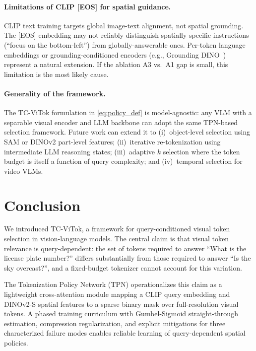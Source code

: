 \documentclass[11pt,a4paper]{article}
\begin{document}
\paragraph{Limitations of CLIP [EOS] for spatial guidance.}
CLIP text training targets global image-text alignment, not spatial grounding.
The [EOS] embedding may not reliably distinguish spatially-specific instructions
(``focus on the bottom-left'') from globally-answerable ones. Per-token
language embeddings or grounding-conditioned encoders (e.g., Grounding
DINO~\citep{liu2023gdino}) represent a natural extension. If the ablation A3 vs.\
A1 gap is small, this limitation is the most likely cause.

\paragraph{Generality of the framework.}
The TC-ViTok formulation in \cref{eq:policy_def} is model-agnostic: any VLM
with a separable visual encoder and LLM backbone can adopt the same TPN-based
selection framework. Future work can extend it to (i)~object-level selection
using SAM or DINOv2 part-level features; (ii)~iterative re-tokenization using
intermediate LLM reasoning states; (iii)~adaptive $k$ selection where the token
budget is itself a function of query complexity; and (iv)~temporal selection
for video VLMs.

\section{Conclusion}
\label{sec:conclusion}

We introduced TC-ViTok, a framework for query-conditioned visual token selection
in vision-language models. The central claim is that visual token relevance is
query-dependent: the set of tokens required to answer ``What is the license plate
number?'' differs substantially from those required to answer ``Is the sky
overcast?'', and a fixed-budget tokenizer cannot account for this variation.

The Tokenization Policy Network (TPN) operationalizes this claim as a lightweight
cross-attention module mapping a CLIP query embedding and DINOv2-S spatial
features to a sparse binary mask over full-resolution visual tokens. A phased
training curriculum with Gumbel-Sigmoid straight-through estimation, compression
regularization, and explicit mitigations for three characterized failure modes
enables reliable learning of query-dependent spatial policies.
\end{document}
